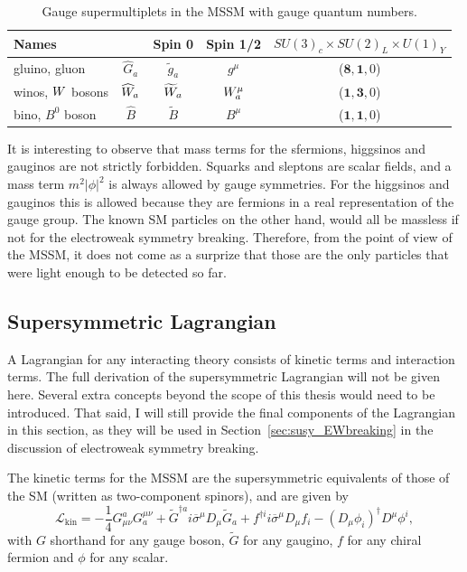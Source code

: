 \begin{table}[t]
  \caption{Gauge supermultiplets in the MSSM with gauge quantum numbers. }
  \begin{center}
  \begin{tabular}{ l c | c c c }
    \toprule
    \multicolumn{2}{l}{Names} & Spin 0 & Spin 1/2 & $SU(3)_c \times SU(2)_L \times U(1)_Y$ \\ 
    \midrule
    gluino, gluon & $\widehat{G}_a$ & $\widetilde{g}_a$ & $g^\mu$ & ($\mathbf{8}, \mathbf{1}, 0$)
\\[1ex]
    winos, $W$ bosons & $\widehat{W}_a$ & $\widetilde{W}_a$ & $W_a^\mu$ &
($\mathbf{1}, \mathbf{3}, 0$)  \\[1ex]
    bino, $B^0$ boson & $\widehat{B}$ & $\widetilde{B}$ & $B^\mu$ & ($\mathbf{1}, \mathbf{1}, 0$) \\
    \bottomrule
  \end{tabular}
  \end{center}
  \label{tab:gauge_multiplets}
\end{table}

It is interesting to observe that mass terms for the sfermions, higgsinos and gauginos are not
strictly forbidden. Squarks and sleptons are scalar fields, and a mass term $m^2|\phi|^2$ is always
allowed by gauge symmetries. For the higgsinos and gauginos this is allowed because they are
fermions in a real representation of the gauge group. 
The known SM particles on the other hand, would all be massless if not for the electroweak symmetry
breaking. Therefore, from the point of view of the MSSM, it does not come as a surprize that those
are the only particles that were light enough to be detected so far.  

\subsection{Supersymmetric Lagrangian \label{sec:susy_lagrangian}}

A Lagrangian for any interacting theory consists of kinetic terms and interaction terms. 
The full derivation of the supersymmetric Lagrangian will not be given here. Several extra concepts
beyond the scope of this thesis would need to be introduced. That said, I will still provide the
final components of the Lagrangian in this section, as they will be used in
Section~\ref{sec:susy_EWbreaking} in the discussion of electroweak symmetry breaking. 

The kinetic terms for the MSSM are the supersymmetric equivalents of those of the SM (written as
two-component spinors), and are given by
\begin{equation}
  \mathcal{L}_{\text{kin}} = - \frac{1}{4} G_{\mu\nu}^a G_a^{\mu\nu} + \widetilde{G}^{\dagger a} i
\overline{\sigma}^\mu D_\mu \widetilde{G}_a 
   + f^{\dagger i} i \overline{\sigma}^\mu D_\mu f_i - (D_\mu \phi_i)^\dagger D^\mu \phi^i,
\end{equation}
with $G$ shorthand for any gauge boson, $\widetilde{G}$ for any gaugino, $f$ for any chiral fermion
and $\phi$ for any scalar. 

